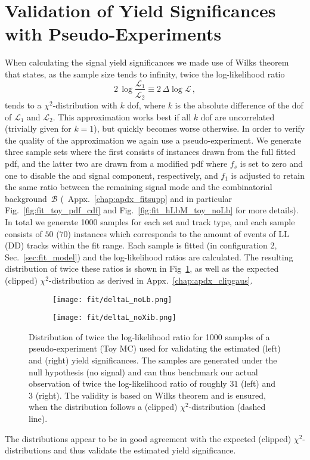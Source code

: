 \section{Validation of Yield Significances with Pseudo-Experiments}
\label{sec:fit_wilkstest}
When calculating the signal yield significances we made use of Wilks theorem~\cite{wilkstheorem} that states, as the sample size tends to infinity, twice the log-likelihood ratio
\begin{equation*}
    2 \, \log \frac{\mathcal{L}_1}{\mathcal{L}_2} \equiv 2 \, \Delta\!\log \mathcal{L} \,,
\end{equation*}
tends to a $\chi^2$-distribution with $k$ \gls{dof}, where $k$ is the absolute difference of the \gls{dof} of $\mathcal{L}_1$ and $\mathcal{L}_2$.
This approximation works best if all $k$ \gls{dof} are uncorrelated (trivially given for $k=1$), but quickly becomes worse otherwise.
In order to verify the quality of the approximation we again use a pseudo-experiment.
We generate three sample sets where the first consists of instances drawn from the full fitted \gls{pdf}, and the latter two are drawn from a modified \gls{pdf} where $f_s$ is set to zero and one to disable the \Lb and \Xibz signal component, respectively, and $f_1$ is adjusted to retain the same ratio between the remaining signal mode and the combinatorial background~$\mathcal{B}$ (\cf{}~Appx.~\ref{chap:apdx_fitsupp} and in particular Fig.~\ref{fig:fit_toy_pdf_cdf} and Fig.~\ref{fig:fit_hLbM_toy_noLb} for more details).
In total we generate \num{1000} samples for each set and track type, and each sample consists of $50$ ($70$) instances which corresponds to the amount of events of \gls{LL} (\gls{DD}) tracks within the fit range.
Each sample is fitted (in configuration 2, \cf{} Sec.~\ref{sec:fit_model}) and the log-likelihood ratios are calculated.
The resulting distribution of twice these ratios is shown in Fig~\ref{fig:toyfit_deltaL_noLbXib}, as well as the expected (clipped) $\chi^2$-distribution as derived in Appx.~\ref{chap:apdx_clipgaus}.
\begin{figure}[htbp]
    \centering
    \begin{subfigure}{.49\textwidth}
        \centering
        \texttt{[image: fit/deltaL\_noLb.png]}
    \end{subfigure}
    \begin{subfigure}{.49\textwidth}
        \centering
        \texttt{[image: fit/deltaL\_noXib.png]}
    \end{subfigure}
    \caption{Distribution of twice the log-likelihood ratio for \num{1000} samples of a pseudo-experiment (Toy MC) used for validating the estimated \Lb (left) and \Xibz (right) yield significances. The samples are generated under the null hypothesis (no signal) and can thus benchmark our actual observation of twice the log-likelihood ratio of roughly $31$ (left) and $3$ (right). The validity is based on Wilks theorem and is ensured, when the distribution follows a (clipped) $\chi^2$-distribution (dashed line).} 
    \label{fig:toyfit_deltaL_noLbXib}
\end{figure}
The distributions appear to be in good agreement with the expected (clipped) $\chi^2$-distributions and thus validate the estimated yield significance.
